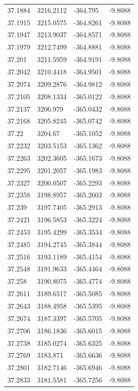 \begin{table}[H]
\begin{tabular}{llll}
37.1884 & 3216.2112 & -364.795 & -9.8088 \\
37.1915 & 3215.0575 & -364.8261 & -9.8088 \\
37.1947 & 3213.9037 & -364.8571 & -9.8088 \\
37.1979 & 3212.7499 & -364.8881 & -9.8088 \\
37.201 & 3211.5959 & -364.9191 & -9.8088 \\
37.2042 & 3210.4418 & -364.9501 & -9.8088 \\
37.2074 & 3209.2876 & -364.9812 & -9.8088 \\
37.2105 & 3208.1334 & -365.0122 & -9.8088 \\
37.2137 & 3206.979 & -365.0432 & -9.8088 \\
37.2168 & 3205.8245 & -365.0742 & -9.8088 \\
37.22 & 3204.67 & -365.1052 & -9.8088 \\
37.2232 & 3203.5153 & -365.1362 & -9.8088 \\
37.2263 & 3202.3605 & -365.1673 & -9.8088 \\
37.2295 & 3201.2057 & -365.1983 & -9.8088 \\
37.2327 & 3200.0507 & -365.2293 & -9.8088 \\
37.2358 & 3198.8957 & -365.2603 & -9.8088 \\
37.239 & 3197.7405 & -365.2913 & -9.8088 \\
37.2421 & 3196.5853 & -365.3224 & -9.8088 \\
37.2453 & 3195.4299 & -365.3534 & -9.8088 \\
37.2485 & 3194.2745 & -365.3844 & -9.8088 \\
37.2516 & 3193.1189 & -365.4154 & -9.8088 \\
37.2548 & 3191.9633 & -365.4464 & -9.8088 \\
37.258 & 3190.8075 & -365.4774 & -9.8088 \\
37.2611 & 3189.6517 & -365.5085 & -9.8088 \\
37.2643 & 3188.4958 & -365.5395 & -9.8088 \\
37.2674 & 3187.3397 & -365.5705 & -9.8088 \\
37.2706 & 3186.1836 & -365.6015 & -9.8088 \\
37.2738 & 3185.0274 & -365.6325 & -9.8088 \\
37.2769 & 3183.871 & -365.6636 & -9.8088 \\
37.2801 & 3182.7146 & -365.6946 & -9.8088 \\
37.2833 & 3181.5581 & -365.7256 & -9.8088 \\

\end{tabular}
\end{table}
